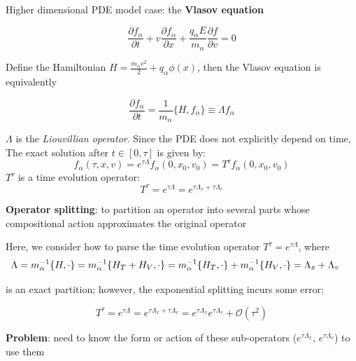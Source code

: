 \documentclass{beamer}
\begin{document}
\begin{frame}{\subsecname}

Higher dimensional PDE model case: the \textbf{Vlasov equation}

$$\frac{\partial f_{\alpha}}{\partial t} + v\frac{\partial f_{\alpha}}{\partial x} + \frac{q_{\alpha}E}{m_{\alpha}}\frac{\partial f}{\partial v} = 0$$

Define the Hamiltonian $H = \frac{m_{\alpha}v^2}{2} + q_{\alpha}\phi(x)$, then the Vlasov equation is equivalently

$$\frac{\partial f_{\alpha}}{\partial t} = \frac{1}{m_{\alpha}}\{H,f_{\alpha}\} \equiv \Lambda f_{\alpha}$$

$\Lambda$ is the \emph{Liouvillian operator}. Since the PDE does not explicitly depend on time, The exact solution after $t\in [0,\tau ]$ is given by:
$$f_{\alpha}(\tau,x,v) = e^{\tau \Lambda} f_{\alpha}(0,x_0,v_0) = T^{\tau}f_{\alpha}(0,x_0,v_0)$$
$T^{\tau}$ is a time evolution operator:
$$T^{\tau} = e^{\tau \Lambda} = e^{\tau \Lambda_x + \tau \Lambda_v}$$

\end{frame}


\begin{frame}{\subsecname}

%

\vspace{2mm}
\textbf{Operator splitting}: to partition an operator into several parts whose compositional action approximates the original operator



\vspace{1mm}
Here, we consider how to parse the time evolution operator $T^{\tau} = e^{\tau \Lambda}$, where
$$\hspace{-4.5mm}\Lambda = m_{\alpha}^{-1}\{H,\cdot\} = m_{\alpha}^{-1}\{H_T + H_V,\cdot \} = m_{\alpha}^{-1}\{H_T,\cdot\} + m_{\alpha}^{-1}\{H_V,\cdot\} = \Lambda_x + \Lambda_v$$

is an exact partition; however, the exponential splitting incurs some error:

$$T^{\tau} = e^{\tau \Lambda} = e^{\tau \Lambda_x + \tau \Lambda_v} = e^{\tau \Lambda_x} e^{\tau \Lambda_v} + \mathcal{O}(\tau^2)$$

\textbf{Problem}: need to know the form or action of these sub-operators ($e^{\tau \Lambda_x}$, $e^{\tau \Lambda_v}$) to use them

\end{frame} 
\end{document}
